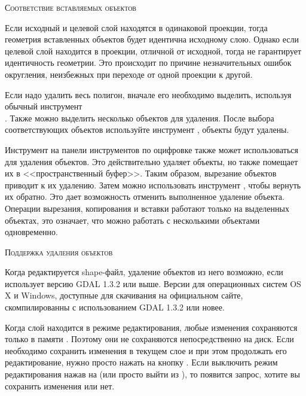 \begin{Tip}\caption{\textsc{Соответствие вставляемых объектов}}
Если исходный и целевой слой находятся в одинаковой проекции, тогда
геометрия вставленных объектов будет идентична исходному слою. Однако если
целевой слой находится в проекции, отличной от исходной, тогда \qg не гарантирует
идентичность геометрии. Это происходит по причине незначительных ошибок
округления, неизбежных при переходе от одной проекции к другой.
\end{Tip}


Если надо удалить весь полигон, вначале его необходимо выделить, используя
обычный инструмент \\
. Также можно
выделить несколько объектов для удаления. После выбора соответствующих
объектов используйте инструмент
, объекты будут удалены.

Инструмент  на панели
инструментов по оцифровке также может использоваться для удаления объектов.
Это действительно удаляет объекты, но также помещает их в <<пространственный
буфер>>. Таким образом, вырезание объектов приводит к их удалению. Затем можно
использовать инструмент ,
чтобы вернуть их обратно. Это дает возможность отменить выполненное удаление
объекта. Операции вырезания, копирования и вставки работают только на
выделенных объектах, это означает, что можно работать с несколькими объектами
одновременно.

\begin{Tip}\caption{\textsc{Поддержка удаления объектов}}
Когда редактируется shape-файл, удаление объектов из него возможно, если
\qg использует версию GDAL 1.3.2 или выше. Версии \qg для операционных
систем OS X и Windows, доступные для скачивания на официальном сайте,
скомпилированны с использованием GDAL 1.3.2 или новее.
\end{Tip}


Когда слой находится в режиме редактирования, любые изменения сохраняются
только в памяти \qg. Поэтому они не сохраняются непосредственно на диск.
Если необходимо сохранить изменения в текущем слое и при этом продолжать
его редактирование, нужно просто нажать на кнопку
. Если выключить режим
редактирования нажав на 
(или просто выйти из \qg), то появится запрос, хотите вы сохранить
изменения или нет.

